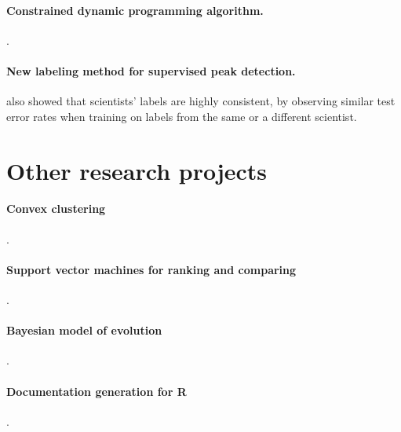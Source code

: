 \documentclass{article}
\begin{document}
\paragraph{Constrained dynamic programming algorithm.} \citep{HOCKING-PeakSeg}.

\paragraph{New labeling method for supervised peak detection.}also
showed that scientists' labels are highly consistent, by observing
similar test error rates when training on labels from the same or a
different scientist.

\section{Other research projects}

\paragraph{Convex clustering} \citep{HOCKING-clusterpath}.

\paragraph{Support vector machines for ranking and comparing}\citep{svmcompare}.

\paragraph{Bayesian model of evolution} \citep{HOCKING-evolution}.

\paragraph{Documentation generation for R} \citep{hocking13:inlinedocs}.



\end{document}
